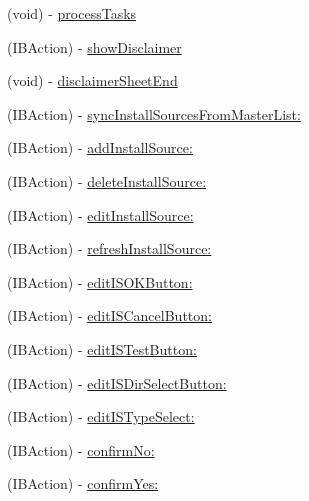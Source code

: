 \begin{DoxyCompactItemize}
\item 
(void) -\/ \hyperlink{interface_module_manage_view_controller_af0aec39eeab414a788c1ffafde757248}{process\-Tasks}
\item 
(I\-B\-Action) -\/ \hyperlink{interface_module_manage_view_controller_ab8226d0b81d187f3fd7965a5dcab46f2}{show\-Disclaimer}
\item 
(void) -\/ \hyperlink{interface_module_manage_view_controller_a12454fdbc5fa842d1d74080fa0f99235}{disclaimer\-Sheet\-End}
\item 
(I\-B\-Action) -\/ \hyperlink{interface_module_manage_view_controller_a7de16fe7cada12d0587f1a8d59b79666}{sync\-Install\-Sources\-From\-Master\-List\-:}
\item 
(I\-B\-Action) -\/ \hyperlink{interface_module_manage_view_controller_a59dcc3d84b1f395fa06bc52d76de1550}{add\-Install\-Source\-:}
\item 
(I\-B\-Action) -\/ \hyperlink{interface_module_manage_view_controller_ad9a9a796518cf53cb5283fd8ba12431c}{delete\-Install\-Source\-:}
\item 
(I\-B\-Action) -\/ \hyperlink{interface_module_manage_view_controller_a771b66629c46bb2671ad5dcde2300407}{edit\-Install\-Source\-:}
\item 
(I\-B\-Action) -\/ \hyperlink{interface_module_manage_view_controller_a2fa1eb47cdb482c84caeedad1182963b}{refresh\-Install\-Source\-:}
\item 
(I\-B\-Action) -\/ \hyperlink{interface_module_manage_view_controller_a34512b945a76a583f38d3a3ab08233b6}{edit\-I\-S\-O\-K\-Button\-:}
\item 
(I\-B\-Action) -\/ \hyperlink{interface_module_manage_view_controller_ac9c8ed6addf9b520b508bbb4e7c8916b}{edit\-I\-S\-Cancel\-Button\-:}
\item 
(I\-B\-Action) -\/ \hyperlink{interface_module_manage_view_controller_a6e987db1aceaac0334cd2677db9c5291}{edit\-I\-S\-Test\-Button\-:}
\item 
(I\-B\-Action) -\/ \hyperlink{interface_module_manage_view_controller_a47420c0208e865f69170bd08563a7417}{edit\-I\-S\-Dir\-Select\-Button\-:}
\item 
(I\-B\-Action) -\/ \hyperlink{interface_module_manage_view_controller_a778b6cff002aa7f210dc376588c26821}{edit\-I\-S\-Type\-Select\-:}
\item 
(I\-B\-Action) -\/ \hyperlink{interface_module_manage_view_controller_ad47ebb42a3a3b1b493f2f9f3e4df6620}{confirm\-No\-:}
\item 
(I\-B\-Action) -\/ \hyperlink{interface_module_manage_view_controller_a1dda75636169e784d064ef6ed1971787}{confirm\-Yes\-:}
\end{DoxyCompactItemize}
